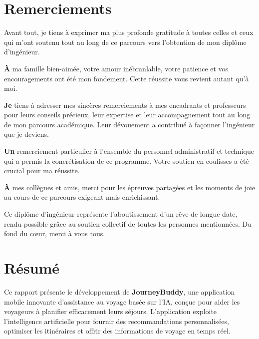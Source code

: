 \documentclass{rapportESPRIM}
\begin{document}
\renewcommand{\contentsname}{Table des Matières}

\fairepagedegarde

\clearpage
\thispagestyle{empty}
\null
\clearpage


\chapter*{Remerciements}
Avant tout, je tiens à exprimer ma plus profonde gratitude à toutes celles et ceux qui m'ont soutenu tout au long de ce parcours vers l'obtention de mon diplôme d'ingénieur.

\textbf{À} ma famille bien-aimée, votre amour inébranlable, votre patience et vos encouragements ont été mon fondement. Cette réussite vous revient autant qu'à moi.

\textbf{Je} tiens à adresser mes sincères remerciements à mes encadrants et professeurs pour leurs conseils précieux, leur expertise et leur accompagnement tout au long de mon parcours académique. Leur dévouement a contribué à façonner l'ingénieur que je deviens.

\textbf{Un} remerciement particulier à l’ensemble du personnel administratif et technique qui a permis la concrétisation de ce programme. Votre soutien en coulisses a été crucial pour ma réussite.

\textbf{À} mes collègues et amis, merci pour les épreuves partagées et les moments de joie au cours de ce parcours exigeant mais enrichissant.

Ce diplôme d’ingénieur représente l’aboutissement d’un rêve de longue date, rendu possible grâce au soutien collectif de toutes les personnes mentionnées. Du fond du cœur, merci à vous tous.

\chapter*{Résumé}
Ce rapport présente le développement de \textbf{JourneyBuddy}, une application mobile innovante d’assistance au voyage basée sur l’IA, conçue pour aider les voyageurs à planifier efficacement leurs séjours. L’application exploite l’intelligence artificielle pour fournir des recommandations personnalisées, optimiser les itinéraires et offrir des informations de voyage en temps réel.
\end{document}
